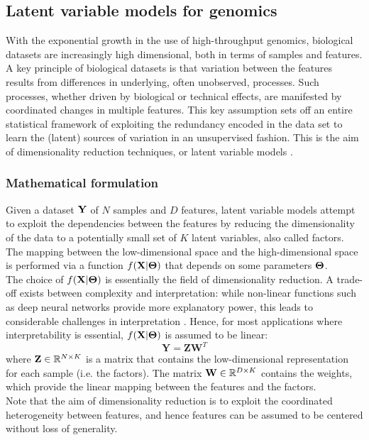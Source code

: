 
\subsection{Latent variable models for genomics}

With the exponential growth in the use of high-throughput genomics, biological datasets are increasingly high dimensional, both in terms of samples and features. A key principle of biological datasets is that variation between the features results from differences in underlying, often unobserved, processes. Such processes, whether driven by biological or technical effects, are manifested by coordinated changes in multiple features. This key assumption sets off an entire statistical framework of exploiting the redundancy encoded in the data set to learn the (latent) sources of variation in an unsupervised fashion. This is the aim of dimensionality reduction techniques, or latent variable models \cite{Komili2008, Stegle2012, Leek2007, Pournara2007, Dai2017, Genevieve2018, Meng2016}.


\subsubsection{Mathematical formulation}

Given a dataset ${\bf Y}$ of $N$ samples and $D$ features, latent variable models attempt to exploit the dependencies between the features by reducing the dimensionality of the data to a potentially small set of $K$ latent variables, also called factors. The mapping between the low-dimensional space and the high-dimensional space is performed via a function $f({\bf X}|\mbox{\boldmath $\Theta$})$ that depends on some parameters $\mbox{\boldmath $\Theta$}$.\\
The choice of $f({\bf X}|\mbox{\boldmath $\Theta$})$ is essentially the field of dimensionality reduction. A trade-off exists between complexity and interpretation: while non-linear functions such as deep neural networks provide more explanatory power, this leads to considerable challenges in interpretation \cite{Zhang2018_NN}. Hence, for most applications where interpretability is essential, $f({\bf X}|\mbox{\boldmath $\Theta$})$ is assumed to be linear:
\begin{equation} \label{eq:linear_model}
	\mathbf{Y} = \mathbf{Z}\mathbf{W}^{T}
\end{equation}
where ${\bf Z} \in \mathbb{R}^{N \times K}$ is a matrix that contains the low-dimensional representation for each sample (i.e. the factors). The matrix ${\bf W} \in \mathbb{R}^{D \times K}$ contains the weights, which provide the linear mapping between the features and the factors.\\
Note that the aim of dimensionality reduction is to exploit the coordinated heterogeneity between features, and hence features can be assumed to be centered without loss of generality.

